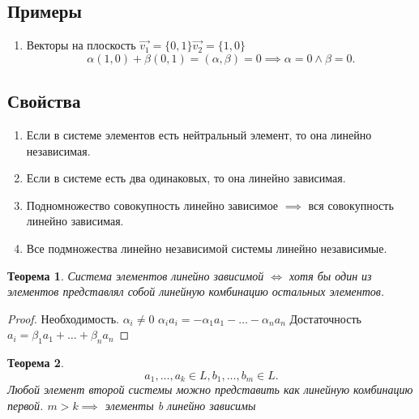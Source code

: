 \documentclass{scrartcl}
\newtheorem{theorem}{Теорема}
\begin{document}
     \subsection{Примеры}
     \begin{enumerate}
         \item Векторы на плоскость $\vec{v_1} = \{0,1\} \vec{v_2} =\{1,0\}$
             \[
             \alpha(1,0) + \beta(0,1) = (\alpha,\beta) = 0 \implies \alpha = 0 \land \beta = 0
             .\] 
     \end{enumerate}
     \subsection{Свойства}
     \begin{enumerate}
         \item Если в системе элементов есть нейтральный элемент, то она линейно независимая.
        \item Если в системе есть два одинаковых, то она линейно зависимая.
        \item Подномножество совокупность линейно зависимое $\implies$ вся совокупность линейно зависимая.
        \item Все подмножества линейно независимой системы линейно независимые.
     \end{enumerate}
     \begin{theorem}
         Система элементов линейно зависимой $\iff$ хотя бы один из элементов представлял собой линейную комбинацию остальных элементов.
     \end{theorem}
     \begin{proof}
        Необходимость. $\alpha_{i} \neq 0$ $\alpha_{i}a_{i} = -\alpha_1 a_{1} - \dots - \alpha_{n} a_{n}$ 
        Достаточность $a_{i} = \beta_1 a_{1} + \dots + \beta_{n} a_{n}$
     \end{proof}
     \begin{theorem}
         \[
         a_1,\dots,a_{k} \in L, b_1,\dots,b_{m} \in L
         .\] 
         Любой элемент второй системы можно представить как линейную комбинацию первой.
         $m > k \implies $ элементы b линейно зависимы
     \end{theorem}
\end{document}

